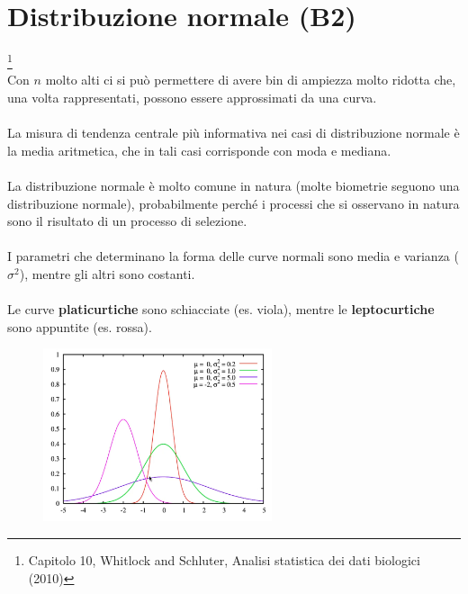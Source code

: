 \documentclass[10pt, draft]{book}
\begin{document}
\chapter{Distribuzione normale (B2)} \footnote{Capitolo 10, Whitlock and Schluter, Analisi statistica dei dati biologici (2010)}
\\
Con $n$ molto alti ci si può permettere di avere bin di ampiezza molto ridotta che, una volta rappresentati, possono essere approssimati da una curva.
\\
\\
La misura di tendenza centrale più informativa nei casi di distribuzione normale è la media aritmetica, che in tali casi corrisponde con moda e mediana.
\\
\\
La distribuzione normale è molto comune in natura (molte biometrie seguono una distribuzione normale), probabilmente perché i processi che si osservano in natura sono il risultato di un processo di selezione.
\\
\\
I parametri che determinano la forma delle curve normali sono media e varianza ($\sigma^2$), mentre gli altri sono costanti.
\\
\\
Le curve \textbf{platicurtiche} sono schiacciate (es. viola), mentre le  \textbf{leptocurtiche} sono appuntite (es. rossa).\\
\begin{figure}[h]\label{normalcurvetypes}
    \centering
    \includegraphics[width=0.6\textwidth]{normalcurvetypes}
    \caption{\small{}}
\end{figure}
\end{document}
